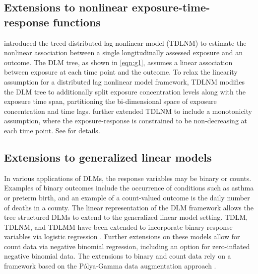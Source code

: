 \subsection{Extensions to nonlinear exposure-time-response functions} \label{sec:nonlinear}
\cite{mork_treed_2022} introduced the treed distributed lag nonlinear model (TDLNM) to estimate the nonlinear association between a single longitudinally assessed exposure and an outcome. The DLM tree, as shown in \eqref{eqn:g1}, assumes a linear association between exposure at each time point and the outcome. To relax the linearity assumption for a distributed lag nonlinear model framework, TDLNM modifies the DLM tree to additionally split exposure concentration levels along with the exposure time span, partitioning the bi-dimensional space of exposure concentration and time lags. \cite{mork_monotone_2024} further extended TDLNM to include a monotonicity assumption, where the exposure-response is constrained to be non-decreasing at each time point. See \cite{mork_treed_2022, mork_monotone_2024} for details.

\subsection{Extensions to generalized linear models} \label{sec:glm}
In various applications of DLMs, the response variables may be binary or counts. Examples of binary outcomes include the occurrence of conditions such as asthma or preterm birth, and an example of a count-valued outcome is the daily number of deaths in a county. The linear representation of the DLM framework allows the tree structured DLMs to extend to the generalized linear model setting. TDLM, TDLNM, and TDLMM have been extended to incorporate binary response variables via logistic regression \citep{mork_treed_2022, mork_estimating_2023}. Further extensions on these models allow for count data via negative binomial regression, including an option for zero-inflated negative binomial data. The extensions to binary and count data rely on a framework based on the P\'olya-Gamma data augmentation approach \citep{polson_bayesian_2013, neelon_bayesian_2019}.

